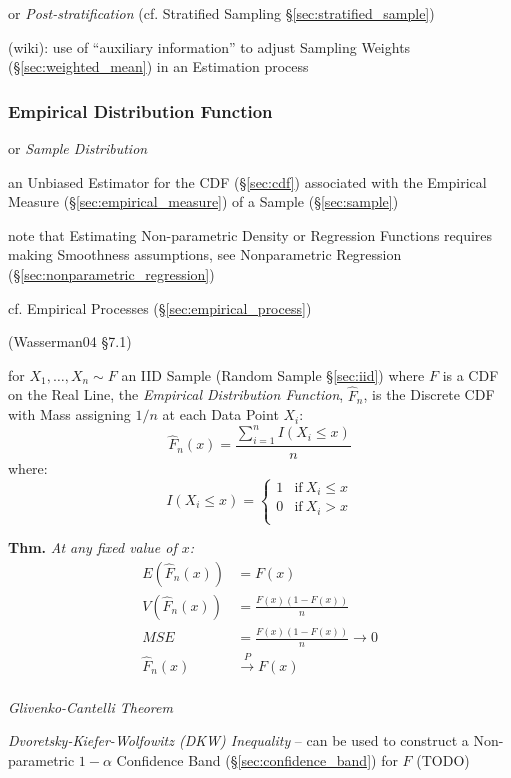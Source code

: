 or \emph{Post-stratification} (cf. Stratified Sampling
\S\ref{sec:stratified_sample})

(wiki): use of ``auxiliary information'' to adjust Sampling Weights
(\S\ref{sec:weighted_mean}) in an Estimation process



\subsubsection{Empirical Distribution Function}
\label{sec:empirical_distribution}

or \emph{Sample Distribution}

an Unbiased Estimator for the CDF (\S\ref{sec:cdf}) associated with the
Empirical Measure (\S\ref{sec:empirical_measure}) of a Sample
(\S\ref{sec:sample})

note that Estimating Non-parametric Density or Regression Functions requires
making Smoothness assumptions, see Nonparametric Regression
(\S\ref{sec:nonparametric_regression})

\fist cf. Empirical Processes (\S\ref{sec:empirical_process})

(Wasserman04 \S7.1)

for $X_1, \ldots, X_n \sim F$ an IID Sample (Random Sample \S\ref{sec:iid})
where $F$ is a CDF on the Real Line, the \emph{Empirical Distribution Function},
$\hat{F}_n$, is the Discrete CDF with Mass assigning $1/n$ at each Data Point
$X_i$:
\[
  \hat{F}_n(x) = \frac{\sum_{i=1}^n I(X_i \leq x)}{n}
\]
where:
\[
  I(X_i \leq x) = \begin{cases}
    1 & \text{if}\ X_i \leq x \\
    0 & \text{if}\ X_i > x \\
  \end{cases}
\]

\textbf{Thm.} \emph{
  At any fixed value of $x$:
  \begin{align*}
    E(\hat{F}_n(x)) & = F(x)                     \\
    V(\hat{F}_n(x)) & = \frac{F(x)(1 - F(x))}{n} \\
    MSE & = \frac{F(x)(1-F(x))}{n} \to 0 \\
    \hat{F}_n(x) & \xrightarrow{P} F(x)          \\
  \end{align*}
}

\emph{Glivenko-Cantelli Theorem}

\emph{Dvoretsky-Kiefer-Wolfowitz (DKW) Inequality} -- can be used to construct a
Non-parametric $1-\alpha$ Confidence Band (\S\ref{sec:confidence_band}) for $F$
(TODO)



